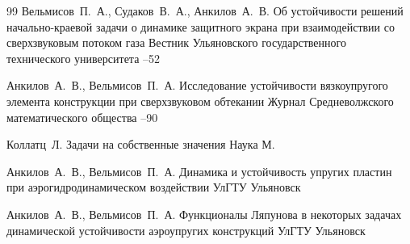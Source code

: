 \begin{thebibliography}{99}
\by Вельмисов~П.~А., Судаков~В.~А., Анкилов~А.~В.
\paper Об устойчивости решений начально-краевой задачи о динамике защитного экрана при взаимодействии со сверхзвуковым потоком газа
\jour Вестник Ульяновского государственного технического университета
--52

\by Анкилов~А.~В., Вельмисов~П.~А.
\paper Исследование устойчивости вязкоупругого элемента конструкции при сверхзвуковом обтекании
\jour Журнал Средневолжского математического общества
--90


\by Коллатц~Л.
\book Задачи на собственные значения
\publ Наука
\publaddr М.

\by Анкилов~А.~В., Вельмисов~П.~А.
\book Динамика и устойчивость упругих пластин при аэрогидродинамическом воздействии
\publ УлГТУ
\publaddr Ульяновск

\by Анкилов~А.~В., Вельмисов~П.~А.
\book Функционалы Ляпунова в некоторых задачах динамической устойчивости аэроупругих конструкций
\publ УлГТУ
\publaddr Ульяновск


\end{thebibliography}
